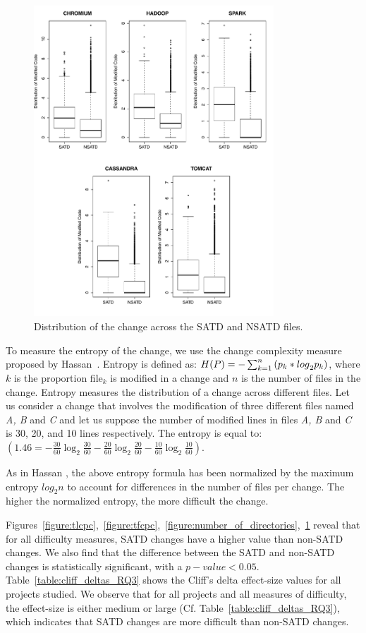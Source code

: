 \begin{figure}[tb]
	\centering
	\includegraphics[width=90mm]{figures/chapter3/entropy_for_all_projects}
	\caption{Distribution of the change across the SATD and NSATD files.}
	\label{figure:mtdocatdf}
\end{figure}


To measure the entropy of the change, we use the change complexity measure proposed by Hassan~\cite{hassan2009predicting}. Entropy is defined as: $H(P)=-\sum _{k=1}^{n}\textrm ({p}_{k}*{log}_{2} {p}_{k})$, where $k$ is the proportion file$_{k}$ is modified in a change and $n$ is the number of files in the change. Entropy measures the distribution of a change across different files. Let us consider a change that involves the modification of three different files named \textit{A, B} and \textit{C} and let us suppose the number of modified lines in files\textit{ A, B} and \textit{C} is 30, 20, and 10 lines respectively. The entropy is equal to:
$(1.46=-\frac{30}{60}\log_{2}\frac{30}{60}-\frac{20}{60}\log_{2}\frac{20}{60}-\frac{10}{60}\log_{2}\frac{10}{60})$.

As in Hassan \cite{hassan2009predicting}, the above entropy formula has been normalized by the maximum entropy $log_{2}n$ to account for differences in the number of files per change. The higher the normalized entropy, the more difficult the change.




 Figures~\ref{figure:tlcpc},~\ref{figure:tfcpc},~\ref{figure:number_of_directories},~\ref{figure:mtdocatdf} reveal that for all difficulty measures, SATD changes have a higher value than non-SATD changes. We also find that the difference between the SATD and non-SATD changes is statistically significant, with a $p-value<0.05$. Table~\ref{table:cliff_deltas_RQ3} shows the Cliff's delta effect-size values for all projects studied. We observe that for all projects and all measures of difficulty, the effect-size is either medium or large (Cf. Table~\ref{table:cliff_deltas_RQ3}), which indicates that SATD changes are more difficult than non-SATD changes.


